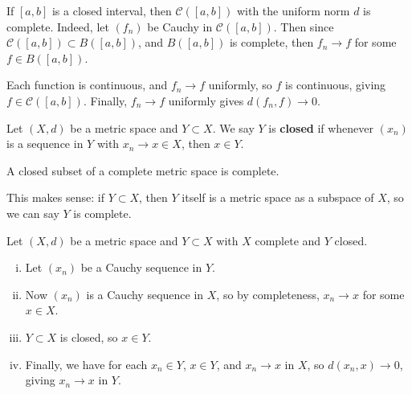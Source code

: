 \documentclass[12pt]{article}
\begin{document}
\begin{exbox}
	If $[a, b]$ is a closed interval, then $\mathcal{C}([a, b])$ with the uniform norm $d$ is complete. Indeed, let $(f_n)$ be Cauchy in $\mathcal{C}([a, b])$. Then since $\mathcal{C}([a, b]) \subset B([a, b])$, and $B([a, b])$ is complete, then $f_n \to f$ for some $f \in B([a, b])$.

	Each function is continuous, and $f_n \to f$ uniformly, so $f$ is continuous, giving $f \in \mathcal{C}([a, b])$. Finally, $f_n \to f$ uniformly gives $d(f_n, f) \to 0$.
\end{exbox}

\begin{definition}
	Let $(X, d)$ be a metric space and $Y \subset X$. We say $Y$ is \textbf{closed} if whenever $(x_n)$ is a sequence in $Y$ with $x_n \to x \in X$, then $x \in Y$.
\end{definition}

\begin{proposition}
	A closed subset of a complete metric space is complete.
\end{proposition}

\begin{remark}
	This makes sense: if $Y \subset X$, then $Y$ itself is a metric space as a subspace of $X$, so we can say $Y$ is complete.
\end{remark}

\begin{proofbox}
	Let $(X, d)$ be a metric space and $Y \subset X$ with $X$ complete and $Y$ closed.
	\begin{enumerate}[(i)]
		\item Let $(x_n)$ be a Cauchy sequence in $Y$.
		\item Now $(x_n)$ is a Cauchy sequence in $X$, so by completeness, $x_n \to x$ for some $x \in X$.
		\item $Y \subset X$ is closed, so $x \in Y$.
		\item Finally, we have for each $x_n \in Y$, $x \in Y$, and $x_n \to x$ in $X$, so $d(x_n, x) \to 0$, giving $x_n \to x$ in $Y$.
	\end{enumerate}
\end{proofbox}
\end{document}
